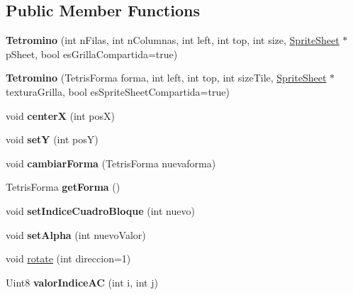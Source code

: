 \subsection*{Public Member Functions}
\begin{DoxyCompactItemize}
\item 
{\bfseries Tetromino} (int n\+Filas, int n\+Columnas, int left, int top, int size, \hyperlink{class_sprite_sheet}{Sprite\+Sheet} $\ast$p\+Sheet, bool es\+Grilla\+Compartida=true)\hypertarget{class_tetromino_af161e43f11726fc240373d50ad86b2dc}{}\label{class_tetromino_af161e43f11726fc240373d50ad86b2dc}

\item 
{\bfseries Tetromino} (Tetris\+Forma forma, int left, int top, int size\+Tile, \hyperlink{class_sprite_sheet}{Sprite\+Sheet} $\ast$textura\+Grilla, bool es\+Sprite\+Sheet\+Compartida=true)\hypertarget{class_tetromino_a3d7bc422469193262cf979ae5d9bc348}{}\label{class_tetromino_a3d7bc422469193262cf979ae5d9bc348}

\item 
void {\bfseries centerX} (int posX)\hypertarget{class_tetromino_ad1513c80dce49628a7cee2042a1d4f8d}{}\label{class_tetromino_ad1513c80dce49628a7cee2042a1d4f8d}

\item 
void {\bfseries setY} (int posY)\hypertarget{class_tetromino_a7f7f8182708ff785ddecfbd346f17e5c}{}\label{class_tetromino_a7f7f8182708ff785ddecfbd346f17e5c}

\item 
void {\bfseries cambiar\+Forma} (Tetris\+Forma nuevaforma)\hypertarget{class_tetromino_af9e0ff787e1ebe5c27231a917506176b}{}\label{class_tetromino_af9e0ff787e1ebe5c27231a917506176b}

\item 
Tetris\+Forma {\bfseries get\+Forma} ()\hypertarget{class_tetromino_ad4a6d94a1b63470162d2be8a01c04ef6}{}\label{class_tetromino_ad4a6d94a1b63470162d2be8a01c04ef6}

\item 
void {\bfseries set\+Indice\+Cuadro\+Bloque} (int nuevo)\hypertarget{class_tetromino_a8cb5bf307831c20b6367ff235913eab4}{}\label{class_tetromino_a8cb5bf307831c20b6367ff235913eab4}

\item 
void {\bfseries set\+Alpha} (int nuevo\+Valor)\hypertarget{class_tetromino_a9beb85ee4ac7367d7218a632cebd9801}{}\label{class_tetromino_a9beb85ee4ac7367d7218a632cebd9801}

\item 
void \hyperlink{class_tetromino_a6d73ffe7b90de5b74c335f381f9e2436}{rotate} (int direccion=1)
\item 
Uint8 {\bfseries valor\+Indice\+AC} (int i, int j)\hypertarget{class_tetromino_a5542113a55ce4f5517a75b73695dd17c}{}\label{class_tetromino_a5542113a55ce4f5517a75b73695dd17c}


\end{DoxyCompactItemize}
